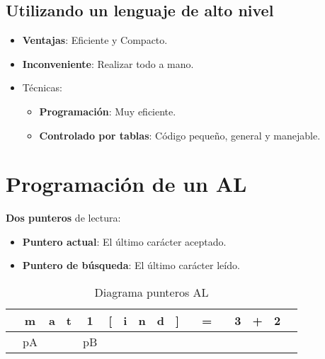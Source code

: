 \documentclass[12pt, twoside, openright]{report} %
\begin{document}
\subsection{Utilizando un lenguaje de alto nivel}

\begin{itemize}
	\item \textbf{Ventajas}: Eficiente y Compacto.
	\item \textbf{Inconveniente}: Realizar todo a mano.
	\item Técnicas:

	      \begin{itemize}
		      \item \textbf{Programación}: Muy eficiente.
		      \item \textbf{Controlado por tablas}: Código pequeño, general y
		            manejable.
	      \end{itemize}
\end{itemize}


\section{Programación de un AL}

\textbf{Dos punteros} de lectura:

\begin{itemize}
	\item \textbf{Puntero actual}: El último carácter aceptado.
	\item \textbf{Puntero de búsqueda}: El último carácter leído.
\end{itemize}

\begin{table}[H]
	\centering
	\begin{tabular}{ccccccccccccccccc}
		\hline
		\multicolumn{1}{|c|}{} & \multicolumn{1}{c|}{m} & \multicolumn{1}{c|}{a} & \multicolumn{1}{c|}{t} & \multicolumn{1}{c|}{1} & \multicolumn{1}{c|}{{[}} & \multicolumn{1}{c|}{i} & \multicolumn{1}{c|}{n} & \multicolumn{1}{c|}{d} & \multicolumn{1}{c|}{{]}} & \multicolumn{1}{c|}{} & \multicolumn{1}{c|}{=} & \multicolumn{1}{c|}{} & \multicolumn{1}{c|}{3} & \multicolumn{1}{c|}{+} & \multicolumn{1}{c|}{2} & \multicolumn{1}{c|}{} \\ \hline
		                       & pA                     &                        &                        & pB                     &                          &                        &                        &                        &                          &                       &                        &                       &                        &                        &                        &
	\end{tabular}
	\caption{Diagrama punteros AL}
\end{table}
\end{document}
